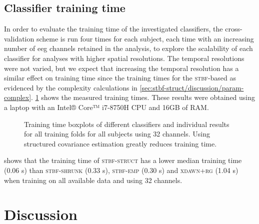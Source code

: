 	\subsection{Classifier training time}
	In order to evaluate the training time of the investigated classifiers, the
	cross-validation scheme is run four times for each subject, each time with an
	increasing number of \ac{eeg} channels retained in the analysis, to explore the scalability of each classifier for analyses with higher spatial resolutions.
	The temporal resolutions were not varied, but we expect that increasing the
	temporal resolution has a similar effect on training time since the
	training times for the \textsc{stbf}-based as evidenced by the complexity
	calculations in \cref{sec:stbf-struct/discussion/param-complex}.
	\cref{fig:stbf-struct/training-time} shows the measured training times.
	These results were obtained using a laptop with an Intel® Core™ i7-8750H CPU and 16GB of RAM.

	\begin{figure}
    \sffamily
    \sansmath
    
    \caption[Classifier training time.]{Training time boxplots of different
    classifiers and individual results for all training folds for all subjects
    using 32 channels. Using structured covariance estimation greatly reduces
    training time.}
		\label{fig:stbf-struct/training-time}
	\end{figure}

	 shows that the training time of
  \textsc{stbf-struct} has a lower median training time (0.06 s) than
  \textsc{stbf-shrunk} (0.33 s), \textsc{stbf-emp} (0.30 s) and
  \textsc{xdawn+rg} (1.04 s) when training
  on all available data and using 32 channels.

	\section{Discussion}

